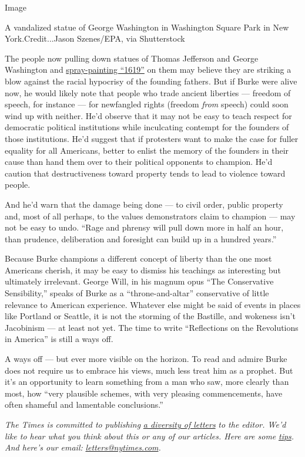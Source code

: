 Image

A vandalized statue of George Washington in Washington Square Park in
New York.Credit...Jason Szenes/EPA, via Shutterstock

The people now pulling down statues of Thomas Jefferson and George
Washington and
\href{https://www.nytimes.com/2020/06/26/opinion/statues-protests.html}{spray-painting
``1619''} on them may believe they are striking a blow against the
racial hypocrisy of the founding fathers. But if Burke were alive now,
he would likely note that people who trade ancient liberties --- freedom
of speech, for instance --- for newfangled rights (freedom \emph{from}
speech) could soon wind up with neither. He'd observe that it may not be
easy to teach respect for democratic political institutions while
inculcating contempt for the founders of those institutions. He'd
suggest that if protesters want to make the case for fuller equality for
all Americans, better to enlist the memory of the founders in their
cause than hand them over to their political opponents to champion. He'd
caution that destructiveness toward property tends to lead to violence
toward people.

And he'd warn that the damage being done --- to civil order, public
property and, most of all perhaps, to the values demonstrators claim to
champion --- may not be easy to undo. ``Rage and phrensy will pull down
more in half an hour, than prudence, deliberation and foresight can
build up in a hundred years.''

Because Burke champions a different concept of liberty than the one most
Americans cherish, it may be easy to dismiss his teachings as
interesting but ultimately irrelevant. George Will, in his magnum opus
``The Conservative Sensibility,'' speaks of Burke as a
``throne-and-altar'' conservative of little relevance to American
experience. Whatever else might be said of events in places like
Portland or Seattle, it is not the storming of the Bastille, and
wokeness isn't Jacobinism --- at least not yet. The time to write
``Reflections on the Revolutions in America'' is still a ways off.

A ways off --- but ever more visible on the horizon. To read and admire
Burke does not require us to embrace his views, much less treat him as a
prophet. But it's an opportunity to learn something from a man who saw,
more clearly than most, how ``very plausible schemes, with very pleasing
commencements, have often shameful and lamentable conclusions.''

\emph{The Times is committed to publishing}
\href{https://www.nytimes.com/2019/01/31/opinion/letters/letters-to-editor-new-york-times-women.html}{\emph{a
diversity of letters}} \emph{to the editor. We'd like to hear what you
think about this or any of our articles. Here are some}
\href{https://help.nytimes.com/hc/en-us/articles/115014925288-How-to-submit-a-letter-to-the-editor}{\emph{tips}}\emph{.
And here's our email:}
\href{mailto:letters@nytimes.com}{\emph{letters@nytimes.com}}\emph{.}

